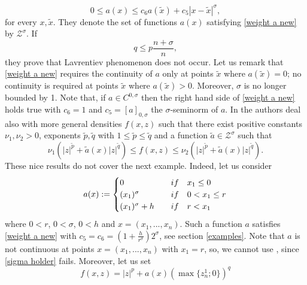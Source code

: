 \documentclass[a4paper,10pt]{article}
\theoremstyle{plain}
\theoremstyle{definition}
\numberwithin{equation}{section} \makeatletter
\begin{document}
\begin{equation}\label{weight a new}
0 \le a(x) \le c_6 a(\tilde{x})+c_5|x-\tilde{x}|^{\sigma},
\end{equation}
for every $x, \tilde{x}$. They denote the set of functions $a(x)$ satisfying \eqref{weight a new}  by $\mathcal{Z^\sigma}.$  If 
\begin{equation}\label{qp BCDFM}
    q\le p\frac{n+\sigma}{n},
\end{equation}
they prove that  Lavrentiev phenomenon does not occur.
Let us remark that \eqref{weight a new} requires the continuity of $a$ only at points $\tilde{x}$ where $a(\tilde{x})=0$; no continuity is required at points $\tilde{x}$ where $a(\tilde{x})>0$. Moreover, 
$\sigma$ is no longer bounded by 1. Note that, if $a \in C^{0,\sigma}$ then the right hand side of \eqref{weight a new} holds true with $c_6=1$ and $c_5= [a]_{0,\sigma}$ the $\sigma$-seminorm of $a$.
\noindent
In \cite{BCDFM} the authors deal also with more general densities $f(x,z)$ such that there exist positive constants $\nu_1,\nu_2 >0$, exponents $\tilde{p},\tilde{q}$ with $1\le \tilde{p} \le \tilde{q}$ and a function $\tilde{a} \in \mathcal{Z}^\sigma$ such that
\begin{equation}\label{hp_structure_BCDFM_new}
 \nu_1(|z|^{\tilde{p}}+ \tilde{a}(x)|z|^{\tilde{q}})\le f(x,z) \le \nu_2(|z|^{\tilde{p}}+ \tilde{a}(x)|z|^{\tilde{q}}).
\end{equation}
These nice results do not cover the next example. Indeed, let us consider 
\begin{equation}\label{a introduction}
a(x):=\begin{cases}
0 &\quad{\rm if}\quad   x_1 \leq 0   \\
(x_1)^{\sigma} &\quad{\rm if}\quad   0 < x_1 \leq r   \\
(x_1)^{\sigma} + h &\quad{\rm if}\quad   r < x_1  
\end{cases}
\end{equation}
where $0 < r$, $0 < \sigma$, $0 < h$ and $x=(x_1,...,x_n)$. Such a function $a$ satisfies \eqref{weight a new} with $c_5=c_6=(1+ \frac h {r^\sigma}) 2^\sigma$, see section \ref{examples}. Note that $a$ is not continuous at points $x=(x_1,...,x_n)$ with $x_1 = r$, so, we cannot use \cite{EspLeoMin-2004}, since \eqref{sigma holder} fails. Moreover, let us set  
\begin{equation}\label{es 1 introduzione}
 f(x,z)=|z|^p+a(x)(\max\{z_n^1; 0\})^q   
\end{equation}
\end{document}
